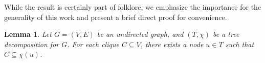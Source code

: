 \documentclass[10pt]{article}
\newtheorem{lemma}[theorem]{Lemma}
\newenvironment{proof}[1][]{\noindent \emph{Proof}\ifthenelse{\equal{#1}{}}{}{ (#1)}.~}{\hfill$\Box$}
\begin{document}
%
While the result is certainly part of folklore, we emphasize the importance for the generality of this work and present a brief direct proof for convenience.

\begin{lemma}\label{lem:cliques}
Let $G=(V,E)$ be an undirected graph, and  $(T,\chi)$ be a tree decomposition for $G$. For each clique $C\subseteq V$, there exists a node $u \in T$ such that $C\subseteq\chi(u)$.
\end{lemma}

%
%
%
\end{document}
